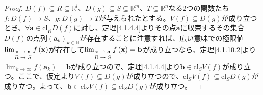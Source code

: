 \documentclass[dvipdfmx]{jsarticle}
\begin{document}
\begin{proof}
$D(f) \subseteq R \subseteq \mathbb{R}^{l}$、$D(g) \subseteq S \subseteq \mathbb{R}^{m}$、$T \subseteq \mathbb{R}^{n}$なる2つの関数たち$f:D(f) \rightarrow S$、$g:D(g) \rightarrow T$が与えられたとする。$V(f) \subseteq D(g)$が成り立つとき、$\forall\mathbf{a} \in \mathrm{cl}_{R}{D(f)}$に対し、定理\ref{4.1.4.4}よりその点$\mathbf{a}$に収束するその集合$D(f)$の点列$\left( \mathbf{a}_{k} \right)_{k \in \mathbb{N}}$が存在することに注意すれば、広い意味での極限値$\lim_{\scriptsize \begin{matrix} \mathbf{x} \rightarrow \mathbf{a} \\ R \rightarrow S \\\end{matrix}}{f\left( \mathbf{x} \right)}$が存在して$\lim_{\scriptsize \begin{matrix} \mathbf{x} \rightarrow \mathbf{a} \\ R \rightarrow S \\\end{matrix}}{f\left( \mathbf{x} \right)} = \mathbf{b}$が成り立つなら、定理\ref{4.1.10.2}より$\lim_{k \rightarrow \infty}{f\left( \mathbf{a}_{k} \right)} = \mathbf{b}$が成り立つので、定理\ref{4.1.4.4}より$\mathbf{b} \in \mathrm{cl}_{S}{V(f)}$が成り立つ。ここで、仮定より$V(f) \subseteq D(g)$が成り立つので、$\mathrm{cl}_{S}{V(f)} \subseteq \mathrm{cl}_{S}{D(g)}$が成り立つ。よって、$\mathbf{b} \in \mathrm{cl}_{S}{V(f)} \subseteq \mathrm{cl}_{S}{D(g)}$が成り立つ。\par

\end{proof}
\end{document}
